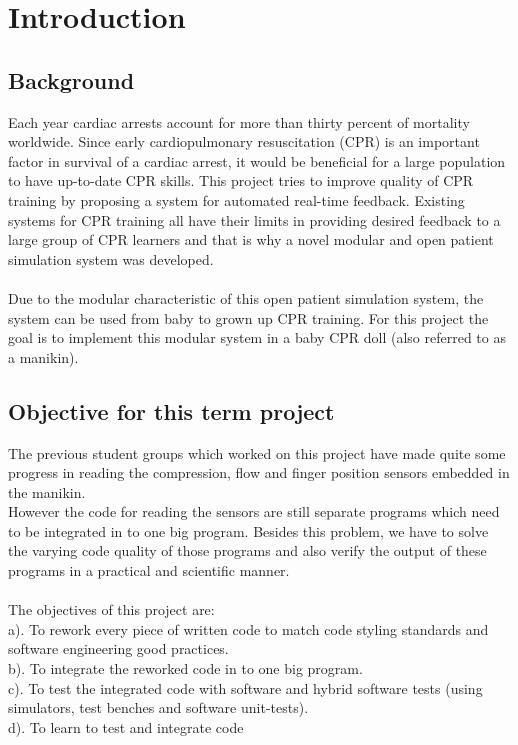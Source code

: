 \chapter{Introduction}
\label{chapter:intro}

\section{Background}
Each year cardiac arrests account for more than thirty percent of mortality worldwide. Since
early cardiopulmonary resuscitation (CPR) is an important factor in survival of a cardiac arrest,
it would be beneficial for a large population to have up-to-date CPR skills. This project tries to
improve quality of CPR training by proposing a system for automated real-time feedback.
Existing systems for CPR training all have their limits in providing desired feedback to a large
group of CPR learners and that is why a novel modular and open patient simulation system was
developed. \cite{jakortenmsc}\\\\
Due to the modular characteristic of this open patient simulation system, the system can be used from baby to grown up CPR training. 
For this project the goal is to implement this modular system in a baby CPR doll (also referred to as a manikin).
\section{Objective for this term project}
The previous student groups which worked on this project have made quite some progress in reading the compression, flow and finger position sensors embedded in the manikin.
\\However the code for reading the sensors are still separate programs which need to be integrated in to one big program. Besides this problem, we have to solve the varying code quality of those programs and also verify the output of these programs in a practical and scientific manner.\\\\
The objectives of this project are:\\
a). To rework every piece of written code to match code styling standards and software engineering good practices.\\
b). To integrate the reworked code in to one big program.\\
c). To test the integrated code with software and hybrid software tests (using simulators, test benches and software unit-tests).\\
d). To learn to test and integrate code 